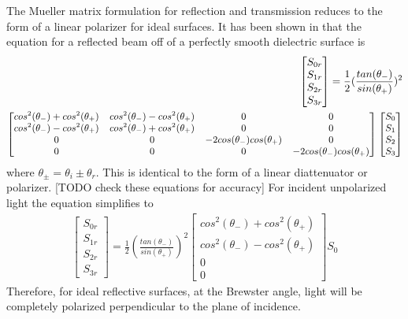 
The Mueller matrix formulation for reflection and transmission reduces to the form of a linear polarizer for ideal surfaces.  It has been shown in \cite{polarizedlight} that the equation for a reflected beam off of a perfectly smooth dielectric surface is
%
\begin{align}
    \begin{split}
    \begin{bmatrix}
        S_{0r} \\
        S_{1r} \\
        S_{2r} \\
        S_{3r}
    \end{bmatrix}
    =
    \frac{1}{2}(\frac{tan(\theta_{-})}{sin(\theta_{+})})^2 \\
    \small
    \begin{bmatrix}
       cos^2(\theta_{-}) + cos^2(\theta_{+}) & cos^2(\theta_{-}) - cos^2(\theta_{+}) & 0 & 0 \\
        cos^2(\theta_{-}) - cos^2(\theta_{+}) & cos^2(\theta_{-}) + cos^2(\theta_{+}) & 0 & 0 \\
        0 & 0 & -2cos(\theta_{-})cos(\theta_{+}) & 0 \\
        0 & 0 & 0 & -2cos(\theta_{-})cos(\theta_{+})
    \end{bmatrix}
    \begin{bmatrix}
        S_0 \\
        S_1 \\
        S_2 \\
        S_3
    \end{bmatrix}
    \end{split}
\end{align}
%
where $\theta_{\pm}=\theta_i \pm \theta_r$. This is identical to the form of a linear diattenuator or polarizer.
[TODO check these equations for accuracy]
For incident unpolarized light the equation simplifies to
%
\begin{align}
    \begin{bmatrix}
        S_{0r} \\
        S_{1r} \\
        S_{2r} \\
        S_{3r}
    \end{bmatrix}
    =
    \frac{1}{2}(\frac{tan(\theta_{-})}{sin(\theta_{+})})^2
    \begin{bmatrix}
        cos^2(\theta_{-}) + cos^2(\theta_{+}) \\
        cos^2(\theta_{-}) - cos^2(\theta_{+}) \\
        0 \\
        0
    \end{bmatrix}
    S_0
\end{align}
%
Therefore, for ideal reflective surfaces, at the Brewster angle, light will be completely polarized perpendicular to the plane of incidence.

